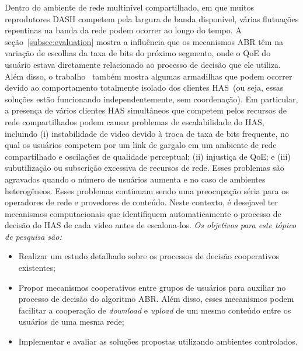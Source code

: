 Dentro do ambiente de rede multinível compartilhado, em que muitos reprodutores DASH competem pela largura de banda disponível, várias flutuações repentinas na banda da rede podem ocorrer ao longo do tempo.
% 
A seção~\ref{subsec:evaluation} mostra a influência que os mecanismos ABR têm na variação de escolhas da taxa de bits do próximo segmento, onde o QoE do usuário estava diretamente relacionado ao processo de decisão que ele utiliza. Além disso, o trabalho~\cite{bentaleb:2018:MSys} também mostra algumas armadilhas que podem ocorrer devido ao comportamento totalmente isolado dos clientes HAS~(ou seja, essas soluções estão funcionando independentemente, sem coordenação). Em particular, a presença de vários clientes HAS simultâneos que competem pelos recursos de rede compartilhados podem causar problemas de escalabilidade do HAS, incluindo (i) instabilidade de video devido à troca de taxa de bits frequente, no qual os usuários competem por um link de gargalo em um ambiente de rede compartilhado e oscilações de qualidade perceptual; (ii) injustiça de QoE; e (iii) subutilização ou subscrição excessiva de recursos de rede. Esses problemas são agravados quando o número de usuários aumenta e no caso de ambientes heterogêneos. Esses problemas continuam sendo uma preocupação séria para os operadores de rede e provedores de conteúdo. 
Neste contexto, é desejavel ter mecanismos computacionais que identifiquem automaticamente o processo de decisão do HAS de cada video antes de escalona-los.
\emph{Os objetivos para este tópico de pesquisa são:}

\begin{itemize}
    \item Realizar um estudo detalhado sobre os processos de decisão cooperativos existentes;
    \item Propor mecanismos cooperativos entre grupos de usuários para auxiliar no processo de decisão do algoritmo ABR. Além disso, esses mecanismos podem facilitar a cooperação de \textit{download} e \textit{upload} de um mesmo conteúdo entre os usuários de uma mesma rede; 
    \item Implementar e avaliar as soluções propostas utilizando ambientes controlados.
\end{itemize}


